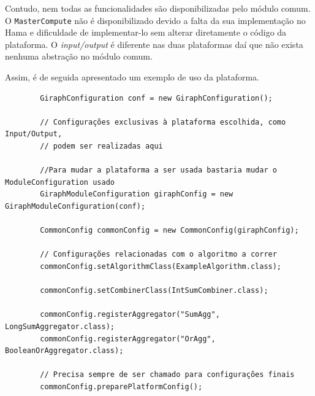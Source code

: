 Contudo, nem todas as funcionalidades são disponibilizadas pelo módulo comum.
O \texttt{MasterCompute} não é disponibilizado devido a falta da sua implementação no Hama e dificuldade
de implementar-lo sem alterar diretamente o código da plataforma.
O \textit{input/output} é diferente nas 
duas plataformas daí que não exista nenhuma abstração no módulo comum.

Assim, é de seguida apresentado um exemplo de uso da plataforma.

\begin{verbatim}
		GiraphConfiguration conf = new GiraphConfiguration();

		// Configurações exclusivas à plataforma escolhida, como Input/Output, 
		// podem ser realizadas aqui
		
		//Para mudar a plataforma a ser usada bastaria mudar o ModuleConfiguration usado
		GiraphModuleConfiguration giraphConfig = new GiraphModuleConfiguration(conf);
		
		CommonConfig commonConfig = new CommonConfig(giraphConfig);
		
		// Configurações relacionadas com o algoritmo a correr
		commonConfig.setAlgorithmClass(ExampleAlgorithm.class);
		
		commonConfig.setCombinerClass(IntSumCombiner.class);
		
		commonConfig.registerAggregator("SumAgg", LongSumAggregator.class);
		commonConfig.registerAggregator("OrAgg", BooleanOrAggregator.class);
		
		// Precisa sempre de ser chamado para configurações finais
		commonConfig.preparePlatformConfig();
\end{verbatim}
